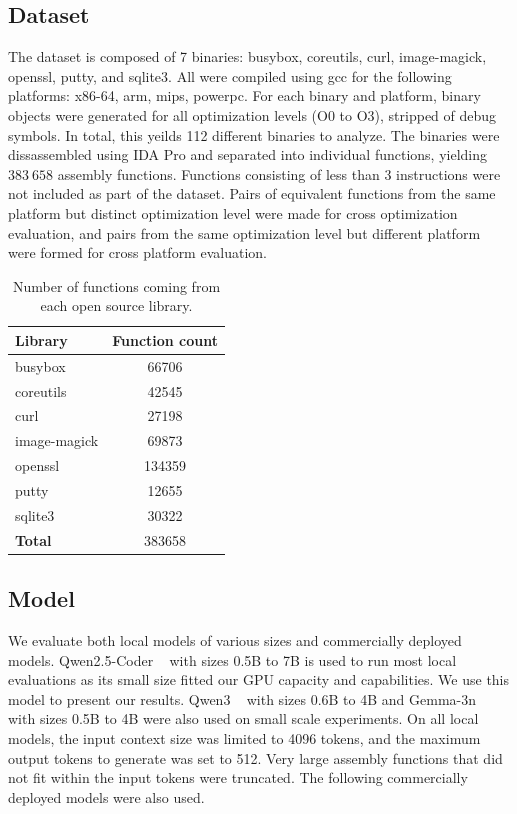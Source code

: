 \documentclass[conference,compsoc]{IEEEtran}
\begin{document}
\subsection{Dataset}

The dataset is composed of 7 binaries: busybox, coreutils, curl, image-magick, openssl, putty, and sqlite3.
All were compiled using gcc for the following platforms: x86-64, arm, mips, powerpc.
For each binary and platform, binary objects were generated for all optimization levels (O0 to O3),
stripped of debug symbols. In total, this yeilds 112 different binaries to analyze.
The binaries were dissassembled using IDA Pro and separated into individual functions, yielding \(383\ 658\) assembly functions.
Functions consisting of less than 3 instructions were not included as part of the dataset.
Pairs of equivalent functions from the same platform but distinct optimization level were made for cross optimization
evaluation, and pairs from the same optimization level but different platform were formed for cross
platform evaluation.

{
    \renewcommand{\arraystretch}{1.3}

    \begin{table}[tbp]
    \centering
    \begin{tabular}{|l|c|}
    \hline
    \bf Library  & \bf Function count \\ \hline
    busybox      & 66706              \\
    coreutils    & 42545              \\
    curl         & 27198              \\
    image-magick & 69873              \\
    openssl      & 134359             \\
    putty        & 12655              \\
    sqlite3      & 30322              \\ \hline
    \bf Total    & 383658             \\ \hline
    \end{tabular}
    \caption{Number of functions coming from each open source library.}
    \end{table}
}
\subsection{Model}

We evaluate both local models of various sizes and commercially deployed models.
Qwen2.5-Coder ~\cite{qwen2} with sizes 0.5B to 7B is used to run most local evaluations as its small size fitted our GPU capacity and capabilities.
We use this model to present our results. Qwen3 ~\cite{qwen3} with sizes 0.6B to 4B and Gemma-3n ~\cite{gemma3} with sizes 0.5B to 4B were also used on
small scale experiments. On all local models, the input context size was limited to 4096 tokens, and the maximum output tokens to generate
was set to 512. Very large assembly functions that did not fit within the input tokens were truncated. The following commercially deployed
models were also used.
\end{document}
